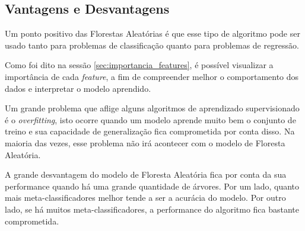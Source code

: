 \subsection{Vantagens e Desvantagens}
Um ponto positivo das Florestas Aleatórias é que esse tipo de algoritmo pode ser usado tanto para problemas de classificação quanto para problemas de regressão. 

Como foi dito na sessão \ref{sec:importancia_features}, é possível visualizar a importância de cada \textit{feature}, a fim de compreender melhor o comportamento dos dados e interpretar o modelo aprendido.

Um grande problema que aflige alguns algoritmos de aprendizado supervisionado é o \textit{overfitting}, isto ocorre quando um modelo aprende muito bem o conjunto de treino e sua capacidade de generalização fica comprometida por conta disso. Na maioria das vezes, esse problema não irá acontecer com o modelo de Floresta Aleatória.

A grande desvantagem do modelo de Floresta Aleatória fica por conta da sua performance quando há uma grande quantidade de árvores. Por um lado, quanto mais meta-classificadores melhor tende a ser a acurácia do modelo. Por outro lado, se há muitos meta-classificadores, a performance do algoritmo fica bastante comprometida.